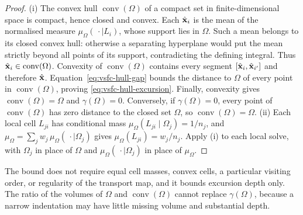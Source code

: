 \begin{proof}
  (i) The convex hull $\operatorname{conv}(\Omega)$ of a compact set in finite-dimensional space is compact, hence closed and convex. Each $\hat {\bm{\mathrm{x}}}_i$ is the mean of the normalised measure $\mu_\Omega(\,\cdot\mid L_i)$, whose support lies in $\Omega$. Such a mean belongs to its closed convex hull: otherwise a separating hyperplane would put the mean strictly beyond all points of its support, contradicting the defining integral. Thus $\hat {\bm{\mathrm{x}}}_i\in\operatorname{conv}(\Omega)$. Convexity of $\operatorname{conv}(\Omega)$ contains every segment $[\hat {\bm{\mathrm{x}}}_i,\hat {\bm{\mathrm{x}}}_{i'}]$ and therefore $\hat{\bm{\mathrm{x}}}$. Equation~\eqref{eq:vsfc-hull-gap} bounds the distance to $\Omega$ of every point in $\operatorname{conv}(\Omega)$, proving \eqref{eq:vsfc-hull-excursion}. Finally, convexity gives $\operatorname{conv}(\Omega)=\Omega$ and $\gamma(\Omega)=0$. Conversely, if $\gamma(\Omega)=0$, every point of $\operatorname{conv}(\Omega)$ has zero distance to the closed set $\Omega$, so $\operatorname{conv}(\Omega)=\Omega$. (ii) Each local cell $L_{ji}$ has conditional mass $\mu_\Omega(L_{ji}\mid\Omega_j)=1/n_j$, and $\mu_\Omega=\sum_jw_j\,\mu_\Omega(\,\cdot\mid\Omega_j)$ gives $\mu_\Omega(L_{ji})=w_j/n_j$. Apply (i) to each local solve, with $\Omega_j$ in place of $\Omega$ and $\mu_\Omega(\,\cdot\mid\Omega_j)$ in place of $\mu_\Omega$.
\end{proof}
The bound does not require equal cell masses, convex cells, a particular visiting order, or regularity of the transport map, and it bounds excursion depth only. The ratio of the volumes of $\Omega$ and $\operatorname{conv}(\Omega)$ cannot replace $\gamma(\Omega)$, because a narrow indentation may have little missing volume and substantial depth.
